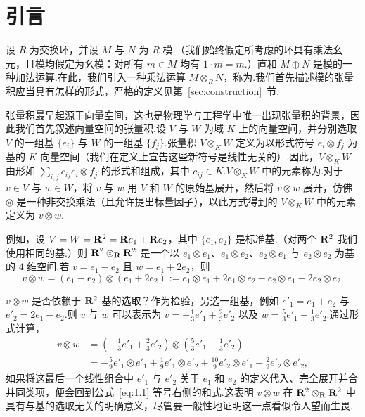 \section{引言}
\label{sec:intro}

设 $R$ 为交换环，并设 $M$ 与 $N$ 为 $R$-模.（我们始终假定所考虑的环具有乘法幺元，且模均假定为幺模：对所有 $m \in M$ 均有 $1 \cdot m = m$.）直和 $M \oplus N$ 是模的一种加法运算.在此，我们引入一种乘法运算 $M \otimes_R N$，称为.我们首先描述模的张量积应当具有怎样的形式，严格的定义见第~\ref{sec:construction}~节.

张量积最早起源于向量空间，这也是物理学与工程学中唯一出现张量积的背景，因此我们首先叙述向量空间的张量积.设 $V$ 与 $W$ 为域 $K$ 上的向量空间，并分别选取 $V$ 的一组基 $\{e_i\}$ 与 $W$ 的一组基 $\{f_j\}$.张量积 $V \otimes_K W$ 定义为以形式符号 $e_i \otimes f_j$ 为基的 $K$-向量空间（我们在定义上宣告这些新符号是线性无关的）.因此，$V \otimes_K W$ 由形如 $\sum_{i,j} c_{ij} e_i \otimes f_j$ 的形式和组成，其中 $c_{ij} \in K$.$V \otimes_K W$ 中的元素称为.对于 $v \in V$ 与 $w \in W$，将 $v$ 与 $w$ 用 $V$ 和 $W$ 的原始基展开，然后将 $v \otimes w$ 展开，仿佛 $\otimes$ 是一种非交换乘法（且允许提出标量因子），以此方式得到的 $V \otimes_K W$ 中的元素定义为 $v \otimes w$.

例如，设 $V = W = \mathbf{R}^2 = \mathbf{R} e_1 + \mathbf{R} e_2$，其中 $\{e_1, e_2\}$ 是标准基.（对两个 $\mathbf{R}^2$ 我们使用相同的基.）则 $\mathbf{R}^2 \otimes_{\mathbf{R}} \mathbf{R}^2$ 是一个以 $e_1 \otimes e_1$、$e_1 \otimes e_2$、$e_2 \otimes e_1$ 与 $e_2 \otimes e_2$ 为基的 $4$ 维空间.若 $v = e_1 - e_2$ 且 $w = e_1 + 2e_2$，则
\begin{equation}
  v \otimes w = (e_1 - e_2) \otimes (e_1 + 2e_2) := e_1 \otimes e_1 + 2e_1 \otimes e_2 - e_2 \otimes e_1 - 2e_2 \otimes e_2. \label{eq:1.1}
\end{equation}

$v \otimes w$ 是否依赖于 $\mathbf{R}^2$ 基的选取？作为检验，另选一组基，例如 $e'_1 = e_1 + e_2$ 与 $e'_2 = 2e_1 - e_2$.则 $v$ 与 $w$ 可以表示为 $v = -\frac{1}{3}e'_1 + \frac{2}{3}e'_2$ 以及 $w = \frac{5}{3}e'_1 - \frac{1}{3}e'_2$.通过形式计算，
\begin{align*}
  v \otimes w &= \left(-\frac{1}{3}e'_1 + \frac{2}{3}e'_2\right) \otimes \left(\frac{5}{3}e'_1 - \frac{1}{3}e'_2\right) \\
  &= -\frac{5}{9}e'_1 \otimes e'_1 + \frac{1}{9}e'_1 \otimes e'_2 + \frac{10}{9}e'_2 \otimes e'_1 - \frac{2}{9}e'_2 \otimes e'_2,
\end{align*}
如果将这最后一个线性组合中 $e'_1$ 与 $e'_2$ 关于 $e_1$ 和 $e_2$ 的定义代入、完全展开并合并同类项，便会回到公式~\eqref{eq:1.1} 等号右侧的和式.这表明 $v \otimes w$ 在 $\mathbf{R}^2 \otimes_{\mathbf{R}} \mathbf{R}^2$ 中具有与基的选取无关的明确意义，尽管要一般性地证明这一点看似令人望而生畏.

